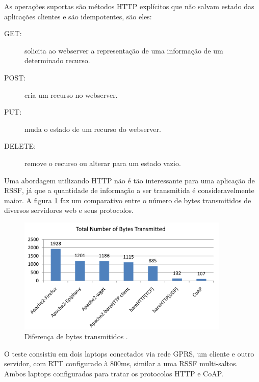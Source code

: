 As opera\c{c}\~oes suportas s\~ao m\'etodos HTTP expl\'icitos que n\~ao salvam estado das aplica\c{c}\~oes clientes e s\~ao idempotentes, s\~ao eles:
\begin{description}
    \item[GET:] solicita ao webserver a representa\c{c}\~ao de uma informa\c{c}\~ao de um determinado recurso.
    \item[POST:] cria um recurso no webserver.
    \item[PUT:] muda o estado de um recurso do webserver.
    \item[DELETE:] remove o recurso ou alterar para um estado vazio.
\end{description}

Uma abordagem utilizando HTTP n\~ao \'e t\~ao interessante para uma aplica\c{c}\~ao de RSSF, j\'a que a quantidade de informa\c{c}\~ao a ser transmitida \'e consideravelmente maior. A figura \ref{bytesTransmitted} faz um comparativo entre o n\'umero de bytes transmitidos de diversos servidores web e seus protocolos.

\begin{figure}[H]
    \centering
    \includegraphics[width=0.9\textwidth]{figuras/bytestransmitted.png}
    \caption{Diferen\c{c}a de bytes transmitidos \cite{kuladinithi2011implementation}.}
    \label{bytesTransmitted}
\end{figure}

O teste consistiu em dois laptops conectados via rede GPRS, um cliente e outro servidor, com RTT configurado \`a 800ms, similar a uma RSSF multi-saltos. Ambos laptops configurados para tratar os protocolos HTTP e CoAP.


